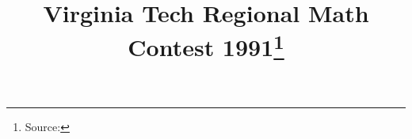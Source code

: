 \documentclass[10pt]{article}
\begin{document}
\title{Virginia Tech Regional Math Contest 1991\footnote{Source: \source}}
\author{\vspace{-2ex}}
\date{\vspace{-6ex}} %
\maketitle








\end{document}

